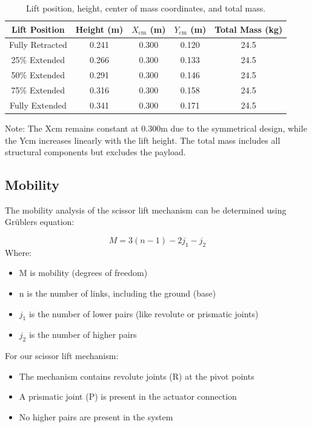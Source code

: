 \documentclass[../../main]{subfiles}
\begin{document}
\begin{table}[h!]
  \centering
  
  \begin{tabular}{|c|c|c|c|c|}
      \hline \rowcolor{red!20}
      \textbf{Lift Position} & \textbf{Height (m)} & \textbf{$X_{\text{cm}}$ (m)} & \textbf{$Y_{\text{cm}}$ (m)} & \textbf{Total Mass (kg)} \\ \hline
      Fully Retracted & 0.241 & 0.300 & 0.120 & 24.5 \\ \hline
      25\% Extended & 0.266 & 0.300 & 0.133 & 24.5 \\ \hline
      50\% Extended & 0.291 & 0.300 & 0.146 & 24.5 \\ \hline
      75\% Extended & 0.316 & 0.300 & 0.158 & 24.5 \\ \hline
      Fully Extended & 0.341 & 0.300 & 0.171 & 24.5 \\ \hline
  \end{tabular}
\caption{Lift position, height, center of mass coordinates, and total mass.}
\end{table}

Note: The Xcm remains constant at 0.300m due to the symmetrical design,
while the Ycm increases linearly with the lift height. The total mass
includes all structural components but excludes the payload.

\subsection{Mobility}

The mobility analysis of the scissor lift mechanism can be determined
using Grübler\textquotesingle s equation:

\begin{equation}
  M = 3(n - 1) - 2j_1 - j_2
\end{equation}
Where:

\begin{itemize}
\item
  M is mobility (degrees of freedom)
\item
  n is the number of links, including the ground (base)
\item
  $j_1$ is the number of lower pairs (like revolute or prismatic joints)
\item
  $j_2$ is the number of higher pairs
\end{itemize}

For our scissor lift mechanism:

\begin{itemize}
\item
  The mechanism contains revolute joints (R) at the pivot points
\item
  A prismatic joint (P) is present in the actuator connection
\item
  No higher pairs are present in the system
\end{itemize}
\end{document}
